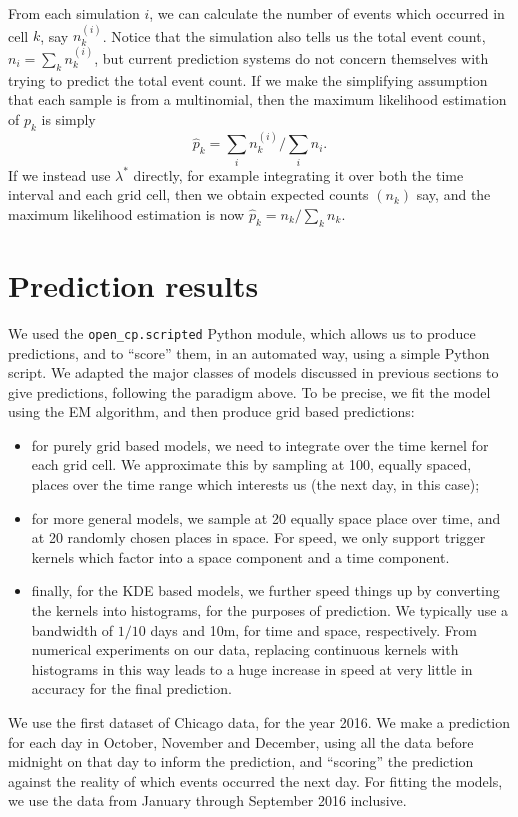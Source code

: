 \documentclass[twoside,a4paper]{article}
\theoremstyle{plain}
\theoremstyle{definition}
\begin{document}
From each simulation $i$, we can calculate the number of events which occurred in cell $k$, say
$n_k^{(i)}$.  Notice that the simulation also tells us the total event count, $n_i=\sum_k n^{(i)}_k$,
but current prediction systems do not concern themselves with trying to predict the total
event count.  If we make the simplifying assumption that each sample is from a multinomial, then the
maximum likelihood estimation of $p_k$ is simply
\[ \hat p_k = \sum_i n_k^{(i)} / \sum_i n_i. \]
If we instead use $\lambda^*$ directly, for example integrating it over both the time interval and
each grid cell, then we obtain expected counts $(n_k)$ say, and the maximum likelihood estimation
is now $\hat p_k = n_k / \sum_k n_k$.



\section{Prediction results}\label{sec:actual_preds}

We used the \texttt{open\_cp.scripted} Python module, which allows us to produce predictions,
and to ``score'' them, in an automated way, using a simple Python script.  We adapted the
major classes of models discussed in previous sections to give predictions, following the
paradigm above.  To be precise, we fit the model using the EM algorithm, and then produce
grid based predictions:
\begin{itemize}
\item for purely grid based models, we need to integrate over the time kernel for each
grid cell.  We approximate this by sampling at 100, equally spaced, places over the time
range which interests us (the next day, in this case);
\item for more general models, we sample at 20 equally space place over time, and at 20 randomly
chosen places in space.  For speed, we only support trigger kernels which factor into a space
component and a time component.
\item finally, for the KDE based models, we further speed things up by converting the
kernels into histograms, for the purposes of prediction.  We typically use a bandwidth of
$1/10$ days and 10m, for time and space, respectively.  From numerical experiments on our data,
replacing continuous kernels with histograms in this way leads to a huge increase in speed
at very little in accuracy for the final prediction.
\end{itemize}

We use the first dataset of Chicago data, for the year 2016.  We make a prediction for each
day in October, November and December, using all the data before midnight on that day to
inform the prediction, and ``scoring'' the prediction against the reality of which events
occurred the next day.  For fitting the models, we use the data from January through
September 2016 inclusive.  
\end{document}
